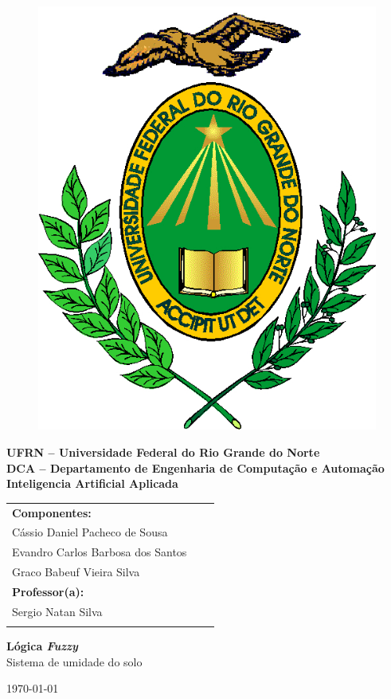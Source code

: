 	\begin{titlepage}
		
		\begin{figure}[t]
			\centering
			\includegraphics[width=0.1\linewidth]{Capa/Figuras/LOGO}
			\label{fig:LOGO}
		\end{figure}

		
		
		\begin{center}
			\textbf{UFRN – Universidade Federal do Rio Grande do Norte\\
				DCA – Departamento de Engenharia de Computação e Automação\\
				Inteligencia Artificial Aplicada
					}
		\end{center}
		
		\vspace{1.5 cm}
		
		\begin{tabular}{l l l}
			
			\textbf{Componentes:} \\
				
			Cássio Daniel Pacheco de Sousa \\
			Evandro Carlos Barbosa dos Santos \\
			\vspace{1.5 cm}
			Graco Babeuf Vieira Silva \\
			
		
			\textbf{Professor(a):}\\
			Sergio Natan Silva\\
			\vspace{4 cm}
			
		\end{tabular}
		
		\begin{center}
			{\textbf{\huge Lógica \textit{Fuzzy}}}\\
			{\large{Sistema de umidade do solo}}\\
		\end{center}
		
		\vspace{6cm}
		\begin{center}
			\today
		\end{center}
		
	\end{titlepage}